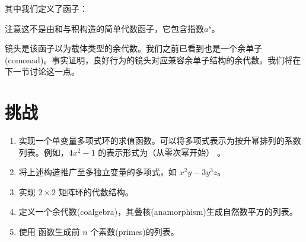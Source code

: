 其中我们定义了函子：

注意这不是由和与积构造的简单代数函子，它包含指数$a^s$。

镜头是该函子以为载体类型的余代数。我们之前已看到也是一个余单子(comonad)。事实证明，良好行为的镜头对应兼容余单子结构的余代数。我们将在下一节讨论这一点。

\section{挑战}

\begin{enumerate}
  \tightlist
  \item
        实现一个单变量多项式环的求值函数。可以将多项式表示为按升幂排列的系数列表。例如，$4x^2-1$ 的表示形式为（从零次幂开始）
        \code{{[}-1, 0, 4{]}}。
  \item
        将上述构造推广至多独立变量的多项式，如 $x^2y-3y^3z$。
  \item
        实现 $2\times{}2$ 矩阵环的代数结构。
  \item
        定义一个余代数(coalgebra)，其叠核(anamorphism)生成自然数平方的列表。
  \item
        使用  函数生成前 $n$ 个素数(primes)的列表。
\end{enumerate}